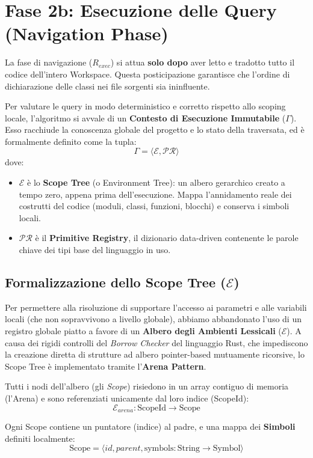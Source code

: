 \section{Fase 2b: Esecuzione delle Query (Navigation Phase)}

La fase di navigazione ($R_{exec}$) si attua \textbf{solo dopo} aver
letto e tradotto tutto il codice dell'intero Workspace. Questa
posticipazione garantisce che l'ordine di dichiarazione delle classi
nei file sorgenti sia ininfluente.

Per valutare le query in modo deterministico e corretto rispetto allo
scoping locale, l'algoritmo si avvale di un \textbf{Contesto di
Esecuzione Immutabile} ($\Gamma$). Esso racchiude la conoscenza
globale del progetto e lo stato della traversata, ed è formalmente
definito come la tupla:
$$ \Gamma = \langle \mathcal{E}, \mathcal{PR} \rangle $$
dove:
\begin{itemize}
  \item $\mathcal{E}$ è lo \textbf{Scope Tree} (o Environment Tree):
    un albero gerarchico creato a tempo zero, appena prima
    dell'esecuzione. Mappa l'annidamento reale dei costrutti del
    codice (moduli, classi, funzioni, blocchi) e conserva i simboli locali.
  \item $\mathcal{PR}$ è il \textbf{Primitive Registry}, il
    dizionario data-driven contenente le parole chiave dei tipi base
    del linguaggio in uso.
\end{itemize}

\subsection{Formalizzazione dello Scope Tree ($\mathcal{E}$)}
Per permettere alla risoluzione di supportare l'accesso ai parametri
e alle variabili locali (che non sopravvivono a livello globale),
abbiamo abbandonato l'uso di un registro globale piatto a favore di
un \textbf{Albero degli Ambienti Lessicali} ($\mathcal{E}$). A causa
dei rigidi controlli del \textit{Borrow Checker} del linguaggio Rust,
che impediscono la creazione diretta di strutture ad albero
pointer-based mutuamente ricorsive, lo Scope Tree è implementato
tramite l'\textbf{Arena Pattern}.

Tutti i nodi dell'albero (gli \textit{Scope}) risiedono in un array
contiguo di memoria (l'Arena) e sono referenziati unicamente dal loro
indice (ScopeId):
$$ \mathcal{E}_{arena} : \text{ScopeId} \to \text{Scope} $$

Ogni Scope contiene un puntatore (indice) al padre, e una mappa dei
\textbf{Simboli} definiti localmente:
$$ \text{Scope} = \langle id, parent, \text{symbols} : \text{String}
\to \text{Symbol} \rangle $$

